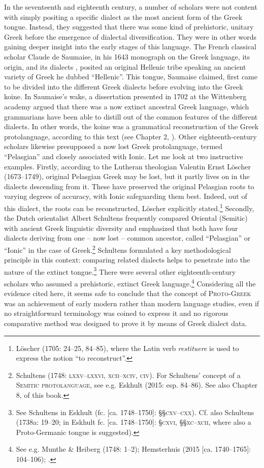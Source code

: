 In the seventeenth and eighteenth century, a number of scholars were not content with simply positing a specific dialect as the most ancient form of the Greek tongue. Instead, they suggested that there was some kind of prehistoric, unitary Greek before the emergence of dialectal diversification. They were in other words gaining deeper insight into the early stages of this language. The French classical scholar Claude de Saumaise, in his 1643 monograph on the Greek language, its origin, and its dialects \citep{Saumaise1643a}, posited an original Hellenic tribe speaking an ancient variety of Greek he dubbed “Hellenic”. This tongue, Saumaise claimed, first came to be divided into the different Greek dialects before evolving into the Greek koine. In Saumaise’s wake, a dissertation presented in 1702 at the Wittenberg academy argued that there was a now extinct ancestral Greek language, which grammarians have been able to distill out of the common features of the different dialects. In other words, the koine was a grammatical reconstruction of the Greek protolanguage, according to this text (see Chapter 2, ). Other eighteenth-century scholars likewise presupposed a now lost Greek protolanguage, termed “Pelasgian” and closely associated with Ionic. Let me look at two instructive examples. Firstly, according to the Lutheran theologian Valentin Ernst Löscher (1673–1749), original Pelasgian Greek may be lost, but it partly lives on in the dialects descending from it. These have preserved the original Pelasgian roots to varying degrees of accuracy, with Ionic safeguarding them best. Indeed, out of this dialect, the roots can be reconstructed, Löscher explicitly stated.\footnote{Löscher (1705: 24–25, 84–85), where the Latin verb \textit{restituere} is used to express the notion “to reconstruct”.} Secondly, the Dutch orientalist Albert Schultens frequently compared Oriental (Semitic) with ancient Greek linguistic diversity and emphasized that both have four dialects deriving from one – now lost – common ancestor, called “Pelasgian” or “Ionic” in the case of Greek.\footnote{Schultens (1748: \textsc{lxxv–lxxvi,} \textsc{xcii–xciv,} \textsc{civ}). For Schultens’ concept of a \textsc{Semitic} \textsc{protolanguage}, see e.g. Eskhult (2015: esp. 84–86). See also Chapter 8,  of this book.} Schultens formulated a key methodological principle in this context: comparing related dialects helps to penetrate into the nature of the extinct tongue.\footnote{See Schultens in Eskhult (fc. [ca. 1748–1750]: §§\textsc{cxv–cxx}). Cf. also Schultens (1738a: 19–20; in Eskhult fc. [ca. 1748–1750]: §\textsc{cxvi}, §§\textsc{xc–xcii,} where also a Proto-Germanic tongue is suggested).} There were several other eighteenth-century scholars who assumed a prehistoric, extinct Greek language.\footnote{See e.g. Munthe \& Heiberg (1748: 1–2); Hemsterhuis (2015 [ca. 1740–1765]: 104–106); \citet[15]{Wise1758}.} Considering all the evidence cited here, it seems safe to conclude that the concept of \textsc{Proto-Greek} was an achievement of early modern rather than modern language studies, even if no straightforward terminology was coined to express it and no rigorous comparative method was designed to prove it by means of Greek dialect data.

